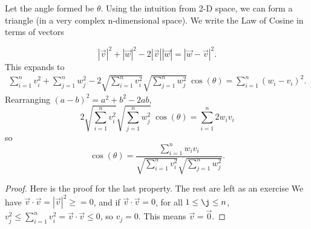Let the angle formed be $\theta$. Using the intuition from 2-D space, we can form a triangle (in a very complex n-dimensional space). We write the Law of Cosine in terms of vectors
 \[
|\vec{v}|^2+|\vec{w}|^2-2|\vec{v}||\vec{w}|= |\vec{w}-\vec{v}|^2.
\]
This expands to \begin{align*}
	\sum_{i=1}^{n} v_i^2 + \sum_{j=1}^{n} w_j^2  - 2 \sqrt{\sum_{i=1}^{n} v_i^2}\sqrt{\sum_{j=1}^{n} w_j^2} \ \cos(\theta) =
	\sum_{i=1}^n (w_i-v_i)^2.
\end{align*}
Rearranging $(a-b)^2 = a^2+b^2-2ab$,
\[
2 \sqrt{\sum_{i=1}^{n} v_i^2}\sqrt{\sum_{j=1}^{n} w_j^2} \ \cos(\theta) = \sum_{i=1}^n 2 w_i v_i 
\]
so \[
\cos(\theta) = \frac{\sum_{i=1}^n w_i v_i }{\sqrt{\sum_{i=1}^{n} v_i^2}\sqrt{\sum_{j=1}^{n} w_j^2}}.
\]
\begin{proof}
	Here is the proof for the last property. The rest are left as an exercise We have $\vec{v}\cdot\vec{v} = |\vec{v}|^2\geq=0$, and if $\vec{v}\cdot\vec{v}=0$, for all $1\leq\j\leq n$, $v_j^2 \leq \sum_{i=1}^{n} v_i^2 = \vec{v}\cdot\vec{v}\leq0$, so $v_j=0$. This means $\vec{v}=\vec{0}$.
\end{proof}
